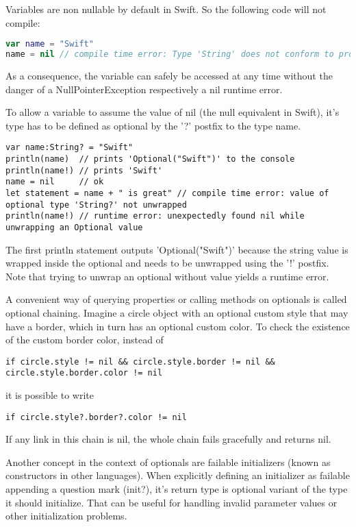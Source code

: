 Variables are non nullable by default in Swift. So the following code will not compile:

\begin{lstlisting}[frame=none, language=swift]
var name = "Swift"
name = nil // compile time error: Type 'String' does not conform to protocol 'NilLiteralConvertible'
\end{lstlisting}

As a consequence, the variable can safely be accessed at any time without the danger of a NullPointerException respectively a nil runtime error.

To allow a variable to assume the value of nil (the null equivalent in Swift), it's type has to be defined as optional by the '?' postfix to the type name.

\begin{lstlisting}[frame=none]
var name:String? = "Swift"
println(name)  // prints 'Optional("Swift")' to the console
println(name!) // prints 'Swift'
name = nil     // ok
let statement = name + " is great" // compile time error: value of optional type 'String?' not unwrapped
println(name!) // runtime error: unexpectedly found nil while unwrapping an Optional value
\end{lstlisting}

The first println statement outputs 'Optional("Swift")' because the string value is wrapped inside the optional and needs to be unwrapped using the '!' postfix. Note that trying to unwrap an optional without value yields a runtime error.

A convenient way of querying properties or calling methods on optionals is called optional chaining. Imagine a circle object with an optional custom style that may have a border, which in turn has an optional custom color. To check the existence of the custom border color, instead of

\begin{lstlisting}[frame=none]
if circle.style != nil && circle.style.border != nil && circle.style.border.color != nil
\end{lstlisting}

it is possible to write

\begin{lstlisting}[frame=none]
if circle.style?.border?.color != nil
\end{lstlisting}

If any link in this chain is nil, the whole chain fails gracefully and returns nil.

Another concept in the context of optionals are failable initializers (known as constructors in other languages). When explicitly defining an initializer as failable appending a question mark (init?), it's return type is optional variant of the type it should initialize. That can be useful for handling invalid parameter values or other initialization problems.

